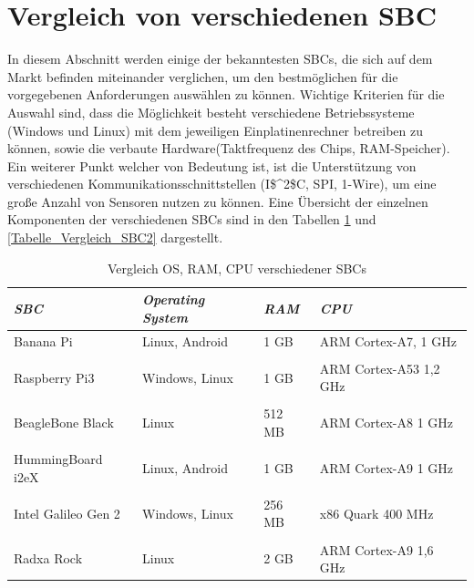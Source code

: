 \section{Vergleich von verschiedenen SBC}
\label{section_Vergleich_SBC}
In diesem Abschnitt werden einige der bekanntesten \acp{SBC}, die sich auf dem Markt befinden miteinander verglichen, um den bestmöglichen für die vorgegebenen Anforderungen auswählen zu können.
Wichtige Kriterien für die Auswahl sind, dass die Möglichkeit besteht verschiedene Betriebssysteme (Windows und Linux) mit dem jeweiligen Einplatinenrechner betreiben zu können, sowie die verbaute Hardware(Taktfrequenz des Chips, RAM-Speicher). Ein weiterer Punkt welcher von Bedeutung ist, ist die Unterstützung von verschiedenen Kommunikationsschnittstellen (\ac{I$^2$C}, \ac{SPI}, 1-Wire), um eine große Anzahl von Sensoren nutzen zu können. Eine Übersicht der einzelnen Komponenten der verschiedenen \acp{SBC} sind in den Tabellen \ref{Tabelle_Vergleich_SBC1} und \ref{Tabelle_Vergleich_SBC2} dargestellt.

\begin{table}[H]
\centering
\begin{tabular}{
llll
}
\toprule
\multicolumn{1}{p{3cm}}{\textit{\ac{SBC}}} & \multicolumn{1}{p{3.5cm}}{\textit{Operating System} } & \multicolumn{1}{p{1,5cm}}{\textit{RAM} }&\multicolumn{1}{p{3cm}}{ \centering\textit{CPU} }\\\midrule
Banana Pi & Linux, Android & 1 GB & ARM Cortex-A7, 1 GHz\\
&&&\\
Raspberry Pi3&Windows, Linux&1 GB&ARM Cortex-A53 1,2 GHz\\
&&&\\
BeagleBone Black & Linux & 512 MB & ARM Cortex-A8 1 GHz\\
&&&\\
HummingBoard i2eX & Linux, Android & 1 GB & ARM Cortex-A9 1 GHz\\
&&&\\
Intel Galileo Gen 2 & Windows, Linux & 256 MB & x86 Quark 400 MHz\\
&&&\\
Radxa Rock & Linux & 2 GB & ARM Cortex-A9 1,6 GHz\\
\bottomrule
\end{tabular}
\caption{Vergleich OS, RAM, CPU verschiedener SBCs}
\label{Tabelle_Vergleich_SBC1}
\end{table}

